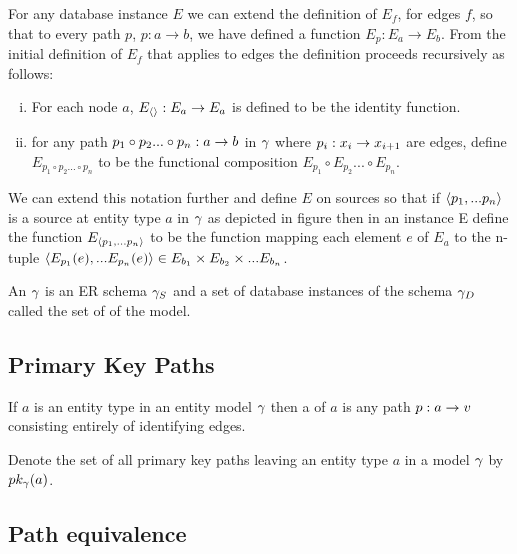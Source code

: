 \noindent For any database instance $E$ we can  extend  the definition of
$E_f$, for edges $f$,  so that to every path $p$, $p: a \rightarrow b$,  we have defined a function $E_p: E_a \rightarrow E_b$. From the initial definition of $E_f$ that applies to 
edges the definition proceeds recursively as follows: 
\begin{enumerate} [(i)]
\item{
For each node $a$, $E_{\langle\rangle}: E_a \rightarrow E_a$ is defined to be the identity function.
}
\item for any path $p_1 \circ p_2... \circ p_n: a \rightarrow b$ in $\gamma$ where $p_i: x_i \rightarrow x_{i+1}$ are edges,
define $E_{p_1 \circ p_2... \circ p_n}$ to be the functional composition $E_{p_1} \circ E_{p_2}... \circ E_{p_n}$.
\end{enumerate}

We can extend this notation further and define $E$ on sources so that if 
$\langle p_1,...p_n\rangle$ is a source at entity type $a$ in $\gamma$ as depicted in figure  then in an instance E
define the function  $E_{\langle p_1,...p_n\rangle}$  to be the function mapping each element $e$ 
of $E_a$ to the n-tuple
$\langle E_{p_1}(e),...E_{p_n}(e)\rangle \in E_{b_1} \times E_{b_2} \times ... E_{b_n}$.

\begin{definition}
\noindent An  $\gamma$ is an ER schema $\gamma_S$ and a set of database instances of the schema $\gamma_D$ called the set of
 of the model. \\
\end{definition}

\subsection{Primary Key Paths}
\begin{definition}
If $a$ is an entity type in an entity model $\gamma$ then a 
of $a$ is any path $p:a \rightarrow v$ consisting entirely of identifying edges. 
\end{definition}

Denote the set of all primary key paths leaving an entity type $a$ in a model $\gamma$ by 
$pk_{\gamma}(a)$.

\subsection{Path equivalence}

